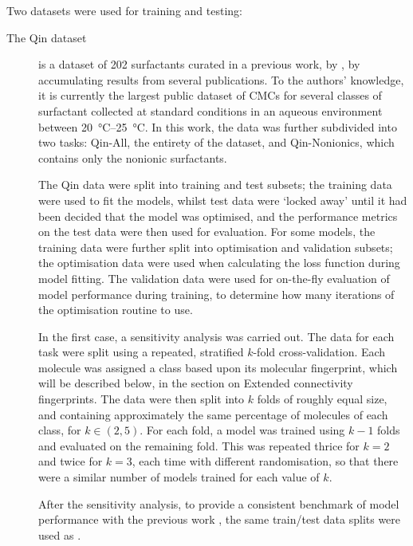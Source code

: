 \newcommand{\lrv}{\vec{v}^{\,(p)}}

Two datasets were used for training and testing:

\begin{description}
    \item[The Qin dataset] is a dataset of 202 surfactants curated in a
          previous work, by \citet{qinPredictingCriticalMicelle2021}, by
          accumulating results from several publications. To the authors'
          knowledge, it is currently the largest public dataset of CMCs for
          several classes of surfactant collected at standard conditions in an
          aqueous environment between \SIrange{20}{25}{\celsius}. In this work,
          the data was further subdivided into two tasks: Qin-All, the entirety of
          the dataset, and Qin-Nonionics, which contains only the nonionic
          surfactants.

          The Qin data were split into training and test subsets; the training
          data were used to fit the models, whilst test data were `locked away'
          until it had been decided that the model was optimised, and the
          performance metrics on the test data were then used for evaluation. For
          some models, the training data were further split into optimisation and
          validation subsets; the optimisation data were used when calculating the
          loss function during model fitting. The validation data were used for
          on-the-fly evaluation of model performance during training, to determine
          how many iterations of the optimisation routine to use.

          In the first case, a sensitivity analysis was carried out. The data for
          each task were split using a repeated, stratified $k$-fold
          cross-validation. Each molecule was assigned a class based upon its
          molecular fingerprint, which will be described below, in the section on
          Extended connectivity fingerprints. The data were then split into $k$
          folds of roughly equal size, and containing approximately the same
          percentage of molecules of each class, for $k \in (2, 5)$. For each
          fold, a model was trained using $k-1$ folds and evaluated on the
          remaining fold. This was repeated thrice for $k = 2$ and twice for $k =
              3$, each time with different randomisation, so that there were a similar
          number of models trained for each value of $k$.

          After the sensitivity analysis, to provide a consistent benchmark of
          model performance with the previous work
          \cite{qinPredictingCriticalMicelle2021}, the same train/test data splits
          were used as \citet{qinPredictingCriticalMicelle2021}.


\end{description}
